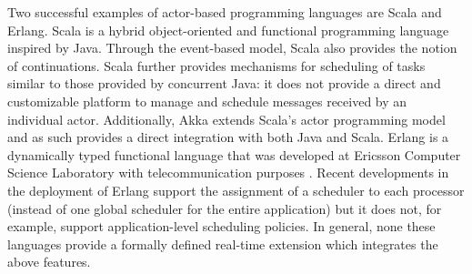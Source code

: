 Two successful examples of actor-based programming languages are Scala and Erlang. 
Scala \cite{scala:actors:ordersky,coord:ordersky} is a hybrid object-oriented and functional programming language inspired by Java. 
Through the event-based model, Scala also provides the notion of continuations. Scala further provides  mechanisms for
scheduling of tasks similar to those provided by concurrent Java:
it does not provide a direct and
customizable platform to manage and schedule  messages
received by an individual actor.
Additionally, Akka \cite{akka:homepage} 
extends Scala's actor programming model and as such provides a direct integration with
both Java and Scala. 
Erlang \cite{erlang:armstrong} is a dynamically typed functional language that
was developed at Ericsson Computer Science Laboratory with telecommunication
purposes \cite{actors_highly:Correa}. Recent developments in the deployment of
Erlang support the assignment of a scheduler to each processor
\cite{erlang_scheduling} (instead of one global scheduler for the entire
application) but it does not, for example, support application-level scheduling policies.
In general,  none these  languages 
provide  a formally defined real-time extension which integrates the above features.

